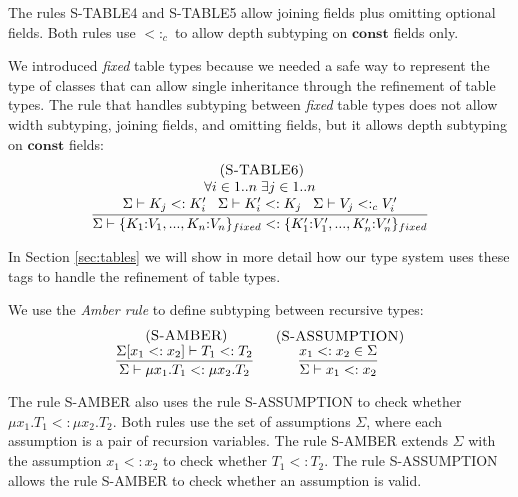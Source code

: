 \documentclass{sigplanconf}
\newcommand{\Const}{\mathbf{const}}
\newcommand{\mylabel}[1]{\; (\textsc{#1})}
\newcommand{\senv}{\Sigma}
\newcommand{\subtype}{<:}
\begin{document}
The rules \textsc{S-TABLE4} and \textsc{S-TABLE5} allow joining fields
plus omitting optional fields.
Both rules use $\subtype_{c}$ to allow depth subtyping on $\Const$ fields only.

We introduced \emph{fixed} table types because we needed a safe way
to represent the type of classes that can allow single inheritance
through the refinement of table types.
The rule that handles subtyping between \emph{fixed} table types
does not allow width subtyping, joining fields, and omitting fields,
but it allows depth subtyping on $\Const$ fields:
\[
\begin{array}{c}
\mylabel{S-TABLE6}\\
\dfrac{\begin{array}{c}
       \forall i \in 1..n \; \exists j \in 1..n \\
       \senv \vdash K_{j} \subtype K_{i}' \;\;\;
       \senv \vdash K_{i}' \subtype K_{j} \;\;\;
       \senv \vdash V_{j} \subtype_{c} V_{i}'
       \end{array}}
      {\senv \vdash \{K_{1}{:}V_{1}, ..., K_{n}{:}V_{n}\}_{fixed} \subtype
                    \{K_{1}'{:}V_{1}', ..., K_{n}'{:}V_{n}'\}_{fixed}}
\end{array}
\]

In Section \ref{sec:tables} we will show in more detail how our type system
uses these tags to handle the refinement of table types.

We use the \emph{Amber rule} \cite{cardelli1986amber} to define
subtyping between recursive types:
\[
\begin{array}{c}
\begin{array}{c}
\mylabel{S-AMBER}\\
\dfrac{\senv[x_{1} \subtype x_{2}] \vdash T_{1} \subtype T_{2}}
      {\senv \vdash \mu x_{1}.T_{1} \subtype \mu x_{2}.T_{2}}
\end{array}
\;
\begin{array}{c}
\mylabel{S-ASSUMPTION}\\
\dfrac{x_{1} \subtype x_{2} \in \senv}
      {\senv \vdash x_{1} \subtype x_{2}}
\end{array}
\end{array}
\]

The rule \textsc{S-AMBER} also uses the rule \textsc{S-ASSUMPTION}
to check whether $\mu x_{1}.T_{1} \subtype \mu x_{2}.T_{2}$.
Both rules use the set of assumptions $\senv$,
where each assumption is a pair of recursion variables.
The rule \textsc{S-AMBER} extends $\senv$ with the assumption
$x_{1} \subtype x_{2}$ to check whether $T_{1} \subtype T_{2}$.
The rule \textsc{S-ASSUMPTION} allows the rule \textsc{S-AMBER}
to check whether an assumption is valid.
\end{document}
